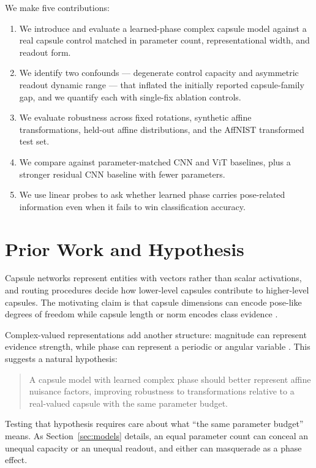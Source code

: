 \documentclass[11pt]{article}
\begin{document}
We make five contributions:
\begin{enumerate}
  \item We introduce and evaluate a learned-phase complex capsule model against a real capsule control matched in parameter count, representational width, and readout form.
  \item We identify two confounds --- degenerate control capacity and asymmetric readout dynamic range --- that inflated the initially reported capsule-family gap, and we quantify each with single-fix ablation controls.
  \item We evaluate robustness across fixed rotations, synthetic affine transformations, held-out affine distributions, and the AffNIST transformed test set.
  \item We compare against parameter-matched CNN and ViT baselines, plus a stronger residual CNN baseline with fewer parameters.
  \item We use linear probes to ask whether learned phase carries pose-related information even when it fails to win classification accuracy.
\end{enumerate}

\section{Prior Work and Hypothesis}
Capsule networks represent entities with vectors rather than scalar activations, and routing procedures decide how lower-level capsules contribute to higher-level capsules. The motivating claim is that capsule dimensions can encode pose-like degrees of freedom while capsule length or norm encodes class evidence \citep{sabour2017dynamic,hinton2018matrix}.

Complex-valued representations add another structure: magnitude can represent evidence strength, while phase can represent a periodic or angular variable \citep{trabelsi2018deepcomplex}. This suggests a natural hypothesis:
\begin{quote}
  A capsule model with learned complex phase should better represent affine nuisance factors, improving robustness to transformations relative to a real-valued capsule with the same parameter budget.
\end{quote}

Testing that hypothesis requires care about what ``the same parameter budget'' means. As Section~\ref{sec:models} details, an equal parameter count can conceal an unequal capacity or an unequal readout, and either can masquerade as a phase effect.
\end{document}
